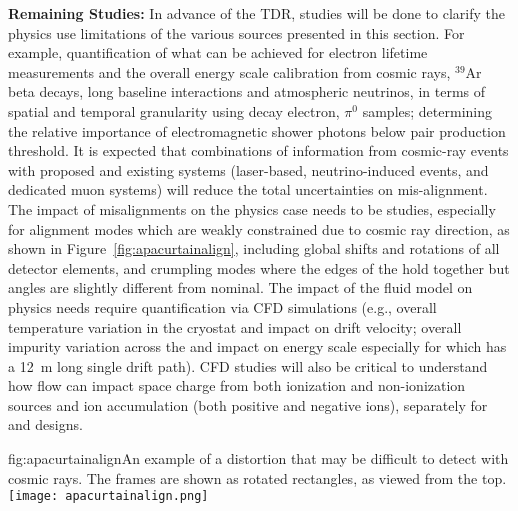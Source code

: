 \textbf{Remaining Studies:} In advance of the TDR, studies will be done to clarify the physics use limitations of the various sources presented in this section. %
For example, quantification of what can be achieved for  electron lifetime measurements and the overall energy scale calibration from cosmic rays,  ${}^{39}$Ar beta decays, long baseline interactions and atmospheric neutrinos, in terms of spatial and temporal granularity using decay electron, $\pi^0$ samples; determining the relative importance of electromagnetic shower photons below pair production threshold. It is expected that combinations of information from cosmic-ray events with proposed and existing systems (laser-based, neutrino-induced events, and dedicated muon systems) will reduce the total uncertainties on mis-alignment.  The impact of misalignments on the physics case needs to be studies, especially for alignment modes which are weakly constrained due to cosmic ray direction, as shown in Figure~\ref{fig:apacurtainalign}, including global shifts and rotations of all detector elements, and crumpling modes where the edges of the  hold together but angles are slightly different from nominal. The impact of the fluid model on physics needs require quantification via CFD simulations (e.g., overall temperature variation in the cryostat and impact on drift velocity; overall impurity variation across the \detmodule and impact on energy scale especially for  which has a \SI{12}{\m} long single drift path). CFD studies will also be critical to understand how \lar flow can impact space charge from both ionization and non-ionization sources and ion accumulation (both positive and negative ions), separately for  and  designs. %

\begin{dunefigure}{fig:apacurtainalign}{An example of a distortion that may be difficult to detect with cosmic rays.  The  frames are shown as
rotated rectangles, as viewed from the top.}
\texttt{[image: apacurtainalign.png]}
\end{dunefigure}

